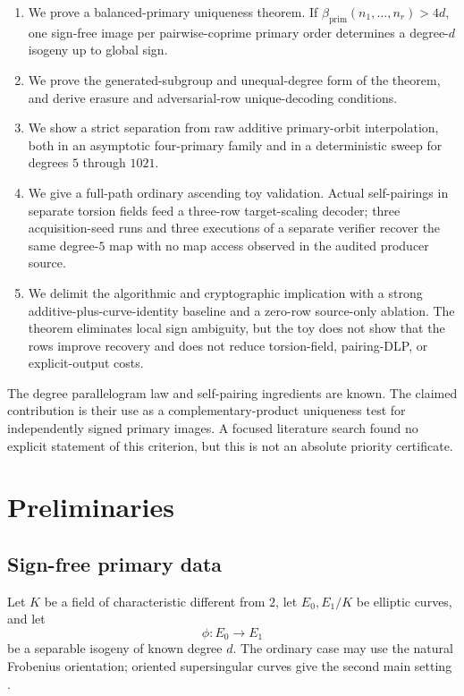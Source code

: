 \documentclass[11pt]{article}
\newcommand{\betaP}{\beta_{\mathrm{prim}}}
\begin{document}
\begin{enumerate}[leftmargin=*,label=(\roman*)]
\item We prove a balanced-primary uniqueness theorem.  If
      $\betaP(n_1,\ldots,n_r)>4d$, one sign-free image per pairwise-coprime
      primary order determines a degree-$d$ isogeny up to global sign.
\item We prove the generated-subgroup and unequal-degree form of the theorem,
      and derive erasure and adversarial-row unique-decoding conditions.
\item We show a strict separation from raw additive primary-orbit
      interpolation, both in an asymptotic four-primary family and in a
      deterministic sweep for degrees $5$ through $1021$.
\item We give a full-path ordinary ascending toy validation.  Actual
      self-pairings in separate torsion fields feed a three-row target-scaling
      decoder; three acquisition-seed runs and three executions of a separate
      verifier recover the same degree-$5$ map with no map access observed in
      the audited producer source.
\item We delimit the algorithmic and cryptographic implication with a strong
      additive-plus-curve-identity baseline and a zero-row source-only
      ablation.  The theorem eliminates local sign ambiguity, but the toy does
      not show that the rows improve recovery and does not reduce
      torsion-field, pairing-DLP, or explicit-output costs.
\end{enumerate}

The degree parallelogram law and self-pairing ingredients are known.  The
claimed contribution is their use as a complementary-product uniqueness test
for independently signed primary images.  A focused literature search found
no explicit statement of this criterion, but this is not an absolute priority
certificate.

\section{Preliminaries}

\subsection{Sign-free primary data}

Let $K$ be a field of characteristic different from $2$, let
$E_0,E_1/K$ be elliptic curves, and let
\[
  \phi:E_0\longrightarrow E_1
\]
be a separable isogeny of known degree $d$.  The ordinary case may use the
natural Frobenius orientation; oriented supersingular curves give the second
main setting \cite{ggr-volcanoes}.
\end{document}
